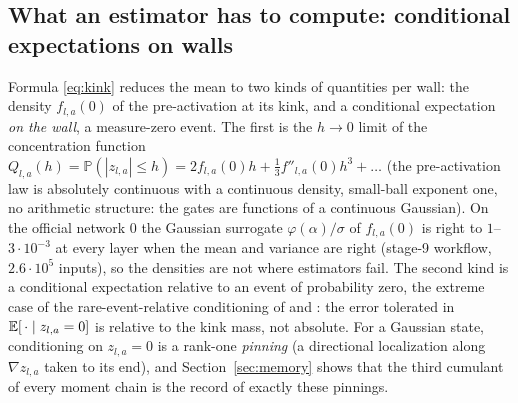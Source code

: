 \subsection{What an estimator has to compute: conditional expectations on walls}
Formula \eqref{eq:kink} reduces the mean to two kinds of quantities per wall: the density $f_{l,a}(0)$ of the
pre-activation at its kink, and a conditional expectation \emph{on the wall}, a measure-zero event. The first is the
$h\to0$ limit of the concentration function $Q_{l,a}(h)=\mathbb P(|z_{l,a}|\le h)=2f_{l,a}(0)h+\tfrac13f''_{l,a}(0)h^3+\dots$
(the pre-activation law is absolutely continuous with a continuous density, small-ball exponent one, no arithmetic
structure: the gates are functions of a continuous Gaussian). On the official network $0$ the Gaussian surrogate
$\varphi(\alpha)/\sigma$ of $f_{l,a}(0)$ is right to $1$--$3\cdot10^{-3}$ at every layer when the mean and variance are
right (stage-9 workflow, $2.6\cdot10^5$ inputs), so the densities are not where estimators fail. The second kind is
a conditional expectation relative to an event of probability zero, the extreme case of the rare-event-relative
conditioning of \cite[\S4]{survey} and \cite{SST}: the error tolerated in $\mathbb E[\,\cdot\mid z_{l,a}=0]$ is relative to
the kink mass, not absolute. For a Gaussian state, conditioning on $z_{l,a}=0$ is a rank-one \emph{pinning}
(a directional localization along $\nabla z_{l,a}$ taken to its end), and Section~\ref{sec:memory} shows that the
third cumulant of every moment chain is the record of exactly these pinnings.
